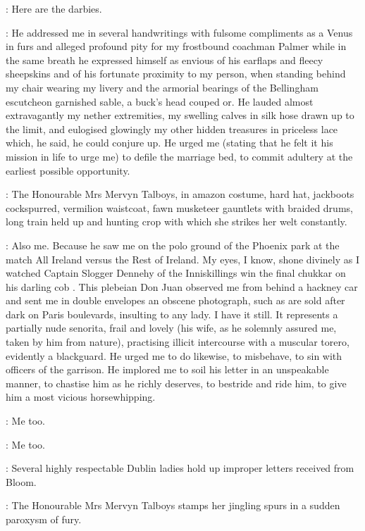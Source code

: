 \SecondWatch:
Here are the darbies.

\Bellingham:
He addressed me in several handwritings with fulsome compliments
as a Venus in furs and alleged profound pity for my frostbound coachman Palmer
while in the same breath he expressed himself
as envious of his earflaps and fleecy sheepskins
and of his fortunate proximity to my person,
when standing behind my chair wearing my livery
and the armorial bearings of the Bellingham escutcheon garnished sable,
a buck's head couped or.
He lauded almost extravagantly my nether extremities,
my swelling calves in silk hose drawn up to the limit,
and eulogised glowingly my other hidden treasures in priceless lace
which,
he said,
he could conjure up.
He urged me (stating that he felt it his mission in life to urge me)
to defile the marriage bed,
to commit adultery at the earliest possible opportunity.

:
The Honourable Mrs Mervyn Talboys,
in amazon costume,
hard hat,
jackboots cockspurred,
vermilion waistcoat,
fawn musketeer gauntlets with braided drums,
long train held up
and hunting crop with which she strikes her welt constantly.

\Talboys:
Also me.
Because he saw me on the polo ground of the Phoenix park
at the match All Ireland versus the Rest of Ireland.
My eyes,
I know,
shone divinely as I watched Captain Slogger Dennehy
of the Inniskillings win the final chukkar on his darling cob .
This plebeian Don Juan observed me from behind a hackney car
and sent me in double envelopes an obscene photograph,
such as are sold after dark on Paris boulevards,
insulting to any lady.
I have it still.
It represents a partially nude senorita,
frail and lovely
(his wife,
as he solemnly assured me,
taken by him from nature),
practising illicit intercourse with a muscular torero,
evidently a blackguard.
He urged me to do likewise,
to misbehave,
to sin with officers of the garrison.
He implored me to soil his letter in an unspeakable manner,
to chastise him as he richly deserves,
to bestride and ride him,
to give him a most vicious horsewhipping.

\Bellingham:
Me too.

\Yelverton:
Me too.

:
Several highly respectable Dublin ladies hold up improper letters
received from Bloom.

:
The Honourable Mrs Mervyn Talboys stamps her jingling spurs
in a sudden paroxysm of fury.

